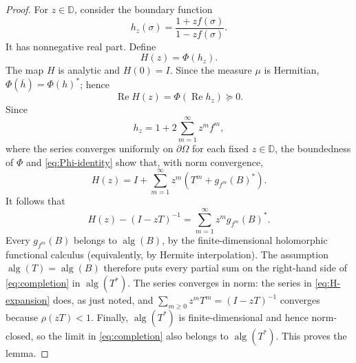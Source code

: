 \documentclass[11pt]{article}
\newcommand{\D}{\mathbb D}
\newcommand{\alg}{\operatorname{alg}}
\newcommand{\RePart}{\operatorname{Re}}
\begin{document}
\begin{proof}
For \(z\in\D\), consider the boundary function
\[
 h_z(\sigma)=\frac{1+zf(\sigma)}{1-zf(\sigma)}.
\]
It has nonnegative real part.  Define
\[
 H(z)=\Phi(h_z).
\]
The map \(H\) is analytic and \(H(0)=I\).  Since the measure \(\mu\) is
Hermitian, \(\Phi(\overline h)=\Phi(h)^*\); hence
\[
 \RePart H(z)=\Phi(\RePart h_z)\succeq0.
\]
Since
\[
 h_z=1+2\sum_{m=1}^{\infty}z^m f^m,
\]
where the series converges uniformly on \(\partial\Omega\) for each
fixed \(z\in\D\), the boundedness of \(\Phi\) and
\eqref{eq:Phi-identity} show that, with norm convergence,
\begin{equation}
 H(z)=I+\sum_{m=1}^{\infty}z^m
 \left(T^m+g_{f^m}(B)^*\right).
 \label{eq:H-expansion}
\end{equation}
It follows that
\begin{equation}
 H(z)-(I-zT)^{-1}
 =\sum_{m=1}^{\infty}z^m g_{f^m}(B)^*.
 \label{eq:completion}
\end{equation}
Every \(g_{f^m}(B)\) belongs to \(\alg(B)\), by the finite-dimensional
holomorphic functional calculus (equivalently, by Hermite
interpolation).  The assumption
\(\alg(T)=\alg(B)\) therefore puts every partial sum on the right-hand
side of \eqref{eq:completion} in \(\alg(T^*)\).  The series converges in
norm: the series in \eqref{eq:H-expansion} does, as just noted, and
\(\sum_{m\geq0}z^mT^m=(I-zT)^{-1}\) converges because
\(\rho(zT)<1\).  Finally, \(\alg(T^*)\) is finite-dimensional and hence
norm-closed, so the limit in \eqref{eq:completion} also belongs to
\(\alg(T^*)\).  This proves the lemma.
\end{proof}
\end{document}
